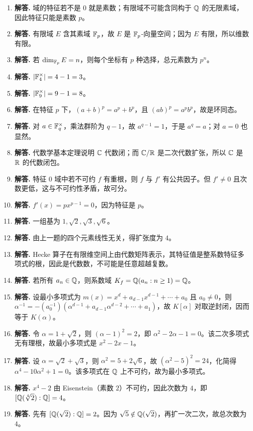 \begin{enumerate}[label=\textbf{\arabic*.}, leftmargin=*, itemsep=1em]
\item \textbf{解答.} 域的特征若不是 $0$ 就是素数；有限域不可能含同构于 $\mathbb{Q}$ 的无限素域，因此特征只能是素数 $p$。
\item \textbf{解答.} 有限域 $E$ 含其素域 $\mathbb{F}_p$，故 $E$ 是 $\mathbb{F}_p$-向量空间；因为 $E$ 有限，所以维数有限。
\item \textbf{解答.} 若 $\dim_{\mathbb{F}_p}E=n$，则每个坐标有 $p$ 种选择，总元素数为 $p^n$。
\item \textbf{解答.} $|\mathbb{F}_4^\times|=4-1=3$。
\item \textbf{解答.} $|\mathbb{F}_9^\times|=9-1=8$。
\item \textbf{解答.} 在特征 $p$ 下，$(a+b)^p=a^p+b^p$，且 $(ab)^p=a^pb^p$，故是环同态。
\item \textbf{解答.} 对 $a\in \mathbb{F}_q^\times$，乘法群阶为 $q-1$，故 $a^{q-1}=1$，于是 $a^q=a$；对 $a=0$ 也显然。
\item \textbf{解答.} 代数学基本定理说明 $\mathbb{C}$ 代数闭；而 $\mathbb{C}/\mathbb{R}$ 是二次代数扩张，所以 $\mathbb{C}$ 是 $\mathbb{R}$ 的代数闭包。
\item \textbf{解答.} 特征 $0$ 域中若不可约 $f$ 有重根，则 $f$ 与 $f'$ 有公共因子。但 $f'\ne0$ 且次数更低，这与不可约性矛盾，故可分。
\item \textbf{解答.} $f'(x)=px^{p-1}=0$，因为特征是 $p$。
\item \textbf{解答.} 一组基为 $1,\sqrt2,\sqrt3,\sqrt6$。
\item \textbf{解答.} 由上一题的四个元素线性无关，得扩张度为 $4$。
\item \textbf{解答.} Hecke 算子在有限维空间上由代数矩阵表示，其特征值是整系数特征多项式的根，因此是代数数，不可能是任意超越复数。
\item \textbf{解答.} 若所有 $a_n\in \mathbb{Q}$，则系数域 $K_f=\mathbb{Q}(a_n:n\ge1)=\mathbb{Q}$。
\item \textbf{解答.} 设最小多项式为 $m(x)=x^d+a_{d-1}x^{d-1}+\cdots+a_0$ 且 $a_0\ne0$，则
$\alpha^{-1}=-(a_0^{-1})(\alpha^{d-1}+a_{d-1}\alpha^{d-2}+\cdots+a_1)$，故 $K[\alpha]$ 对取逆封闭，因而等于 $K(\alpha)$。
\item \textbf{解答.} 令 $\alpha=1+\sqrt2$，则 $(\alpha-1)^2=2$，即 $\alpha^2-2\alpha-1=0$。该二次多项式无有理根，故最小多项式是 $x^2-2x-1$。
\item \textbf{解答.} 设 $\alpha=\sqrt2+\sqrt3$，则 $\alpha^2=5+2\sqrt6$，故 $(\alpha^2-5)^2=24$，化简得 $\alpha^4-10\alpha^2+1=0$。该多项式在 $\mathbb{Q}$ 上不可约，故为最小多项式。
\item \textbf{解答.} $x^4-2$ 由 Eisenstein（素数 $2$）不可约，因此次数为 $4$，即 $[\mathbb{Q}(\sqrt[4]{2}):\mathbb{Q}]=4$。
\item \textbf{解答.} 先有 $[\mathbb{Q}(\sqrt2):\mathbb{Q}]=2$。因为 $\sqrt5\notin \mathbb{Q}(\sqrt2)$，再扩一次二次，故总次数为 $4$。

\end{enumerate}
